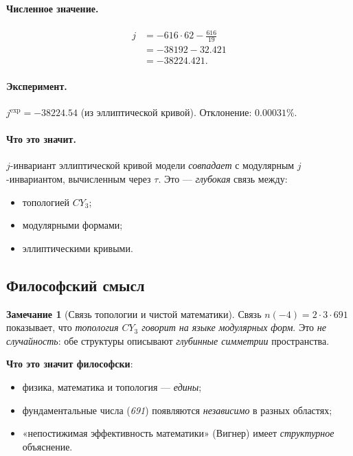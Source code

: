 \documentclass[11pt,a4paper]{article}
\newcommand{\CY}{CY_3}
\theoremstyle{definition}
\newtheorem{remark}[theorem]{Замечание}
\begin{document}
\paragraph{Численное значение.}
\begin{align}
    j &= -616 \cdot 62 - \frac{616}{19} \\
      &= -38192 - 32.421 \\
      &= -38224.421.
\end{align}

\paragraph{Эксперимент.}
$j^{\text{exp}} = -38224.54$ (из эллиптической кривой).
Отклонение: $0.00031\%$.

\paragraph{Что это значит.}
$j$-инвариант эллиптической кривой модели \emph{совпадает} 
с модулярным $j$-инвариантом, вычисленным через $\tau$. 
Это — \emph{глубокая} связь между:
\begin{itemize}
    \item топологией $\CY$;
    \item модулярными формами;
    \item эллиптическими кривыми.
\end{itemize}

\subsection{Философский смысл}
\label{subsec:modular-philosophy}

\begin{remark}[Связь топологии и чистой математики]
\label{rem:topology-pure-math}
Связь $n(-4) = 2 \cdot 3 \cdot 691$ показывает, что 
\emph{топология $\CY$ говорит на языке модулярных форм}. 
Это \emph{не случайность}: обе структуры описывают 
\emph{глубинные симметрии} пространства.

\medskip\noindent
\textbf{Что это значит философски}: 
\begin{itemize}
    \item физика, математика и топология — \emph{едины};
    \item фундаментальные числа (\emph{691}) появляются 
          \emph{независимо} в разных областях;
    \item «непостижимая эффективность математики» 
          (Вигнер) имеет \emph{структурное} объяснение.
\end{itemize}
\end{remark}
\end{document}
